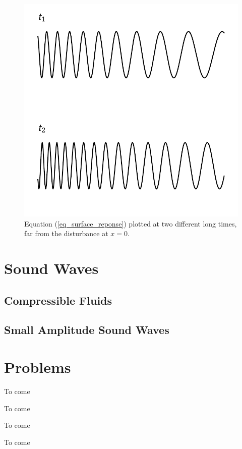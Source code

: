 \begin{figure}
\centering\includegraphics[width=0.7\linewidth]{Figures/Chapter5/fig_local_wave_example}
\caption{Equation (\ref{eq_surface_reponse}) plotted at two different long times, far from the disturbance at $x=0$.}
\label{fig_local_wave_example}
\end{figure}



%
%

\section{Sound Waves}


\subsection{Compressible Fluids}


\subsection{Small Amplitude Sound Waves}





\section*{Problems}
%

\begin{problem}
\label{prob_finite_depth}
To come
\end{problem}

\begin{problem}
\label{prob_grav_cap_dispersion}
To come
\end{problem}

\begin{problem}
\label{prob_two_cosines}
To come
\end{problem}

\begin{problem}
\label{prob_energy}
To come
\end{problem}

